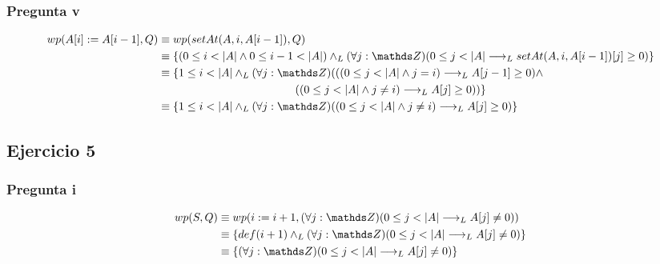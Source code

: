 \subsubsection*{Pregunta v}
\begin{align*}
    wp(A[i] := A[i-1],Q) &\equiv wp(setAt(A, i, A[i-1]),Q) \\
    &\equiv \{ (0 \leq i < |A| \wedge 0 \leq i-1 < |A|) \yLuego (\forall j: \ent)(0 \leq j < |A| \implicaLuego setAt(A, i, A[i-1])[j] \geq 0) \} \\
    &\equiv \{ 1 \leq i < |A| \yLuego (\forall j: \ent)(((0 \leq j < |A| \wedge j = i) \implicaLuego A[j-1] \geq 0) \wedge \\
    &\qquad \qquad \qquad \qquad \qquad \qquad \: ((0 \leq j < |A| \wedge j \neq i) \implicaLuego A[j] \geq 0)) \} \\
    &\equiv \{ 1 \leq i < |A| \yLuego (\forall j: \ent)((0 \leq j < |A| \wedge j \neq i) \implicaLuego A[j] \geq 0) \}
\end{align*}

\subsection{Ejercicio 5}
\subsubsection{Pregunta i}
\begin{align*}
    wp(S, Q) &\equiv wp(i := i+1, (\forall j: \ent)(0 \leq j < |A| \implicaLuego A[j] \neq 0)) \\
    &\equiv \{ def(i+1) \yLuego (\forall j: \ent)(0 \leq j < |A| \implicaLuego A[j] \neq 0) \} \\
    &\equiv \{ (\forall j: \ent)(0 \leq j < |A| \implicaLuego A[j] \neq 0) \} \\
\end{align*}

